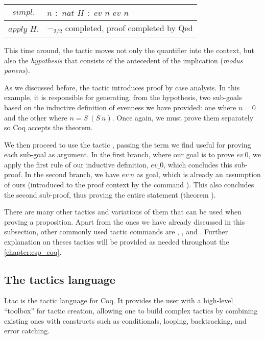 \begin{longtable}{| S | P |}
	\hline
	 & $n$$ $ $ : $ $ nat$\linebreak
	$H$$ $ $ : $ $ ev $ $ n$\linebreak
	\fracrule\linebreak
	$ev $ $ n$\\
	
	\hline
	$apply $ $ H.$ & $-_{2/2}$ completed, proof completed by Qed \label{Proofs:coq-example:Theorem:ev-minus2} \\
	\hline
\end{longtable}

This time around, the tactic  moves not only the quantifier into the context, but also the \emph{hypothesis} that consists of the antecedent of the implication (\emph{modus ponens}).

As we discussed before, the tactic  introduces proof by case analysis. In this example, it is responsible for generating, from the hypothesis, two sub-goals based on the inductive definition of evenness we have provided: one where $ n = 0 $ and the other where $ n = S \ (S \ n) $. Once again, we must prove them separately so Coq accepts the theorem.

We then proceed to use the tactic , passing the term we find useful for proving each sub-goal as argument. In the first branch, where our goal is to prove $ ev \ 0 $, we apply the first rule of our inductive definition, $ ev\_0 $, which concludes this sub-proof. In the second branch, we have $ ev \ n $ as goal, which is already an assumption of ours (introduced to the proof context by the command ). This also concludes the second sub-proof, thus proving the entire statement (theorem ).

There are many other tactics and variations of them that can be used when proving a proposition. Apart from the ones we have already discussed in this subsection, other commonly used tactic commands are , , and . Further explanation on theses tactics will be provided as needed throughout the \autoref{chapter:csp_coq}.

\subsection{The tactics language}

Ltac is the tactic language for Coq. It provides the user with a high-level ``toolbox''  for tactic creation, allowing one to build complex tactics by combining existing ones with constructs such as conditionals, looping, backtracking, and error catching.

